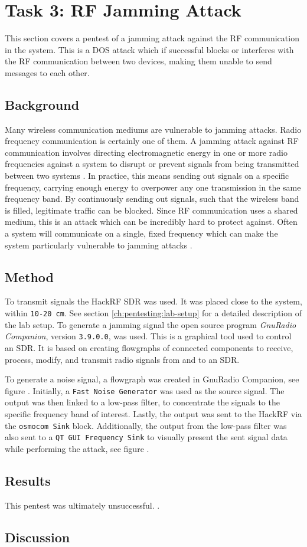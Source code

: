 \section{Task 3: RF Jamming Attack} \label{ch:pentesting:rf-jamming}
This section covers a pentest of a jamming attack against the RF communication in the system. This is a \gls{DOS} attack which if successful blocks or interferes with the RF communication between two devices, making them unable to send messages to each other.

\subsection{Background}
Many wireless communication mediums are vulnerable to jamming attacks. Radio frequency communication is certainly one of them. A jamming attack against RF communication involves directing electromagnetic energy in one or more radio frequencies against a system to disrupt or prevent signals from being transmitted between two systems \cite{adamy2004ew}. In practice, this means sending out signals on a specific frequency, carrying enough energy to overpower any one transmission in the same frequency band. By continuously sending out signals, such that the wireless band is filled, legitimate traffic can be blocked. Since RF communication uses a shared medium, this is an attack which can be incredibly hard to protect against. Often a system will communicate on a single, fixed frequency which can make the system particularly vulnerable to jamming attacks \cite{jamming-feasibility}.

\subsection{Method}
To transmit signals the HackRF SDR was used. It was placed close to the system, within \texttt{10-20 cm}. See section \ref{ch:pentesting:lab-setup} for a detailed description of the lab setup. To generate a jamming signal the open source program \textit{GnuRadio Companion}, version \texttt{3.9.0.0}, was used. This is a graphical tool used to control an SDR. It is based on creating flowgraphs of connected components to receive, process, modify, and transmit radio signals from and to an SDR.

To generate a noise signal, a flowgraph was created in GnuRadio Companion, see figure \todo. Initially, a \texttt{Fast Noise Generator} was used as the source signal. The output was then linked to a low-pass filter, to concentrate the signals to the specific frequency band of interest. Lastly, the output was sent to the HackRF via the \texttt{osmocom Sink} block. Additionally, the output from the low-pass filter was also sent to a \texttt{QT GUI Frequency Sink} to visually present the sent signal data while performing the attack, see figure \todo.

\subsection{Results}
This pentest was ultimately unsuccessful. \todo.

\subsection{Discussion}
\todo
